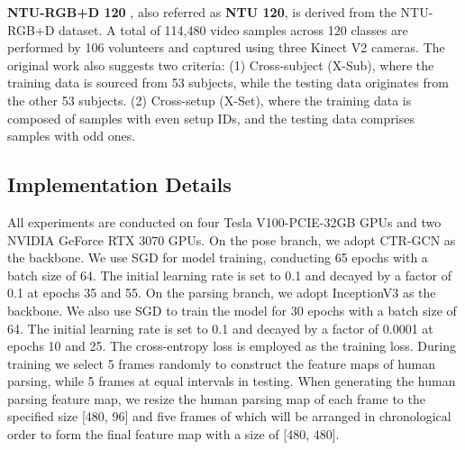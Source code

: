 \documentclass[runningheads]{llncs}
\begin{document}
\textbf{NTU-RGB+D 120} \cite{8713892}, also referred as \textbf{NTU 120}, is derived from the NTU-RGB+D dataset. A total of 114,480 video samples across 120 classes are performed by 106 volunteers and captured using three Kinect V2 cameras. The original work \cite{8713892} also suggests two criteria: (1) Cross-subject (X-Sub), where the training data is sourced from 53 subjects, while the testing data originates from the other 53 subjects. (2) Cross-setup (X-Set), where the training data is composed of samples with even setup IDs, and the testing data comprises samples with odd ones.

\subsection{Implementation Details}
All experiments are conducted on four Tesla V100-PCIE-32GB GPUs and two NVIDIA GeForce RTX 3070 GPUs. On the pose branch, we adopt CTR-GCN \cite{CTR-GCN2021} as the backbone. We use SGD for model training, conducting 65 epochs with a batch size of 64. The initial learning rate is set to 0.1 and decayed by a factor of 0.1 at epochs 35 and 55. On the parsing branch, we adopt InceptionV3 \cite{szegedy2016rethinking} as the backbone. We also use SGD to train the model for 30 epochs with a batch size of 64. The initial learning rate is set to 0.1 and decayed by a factor of 0.0001 at epochs 10 and 25. The cross-entropy loss is employed as the training loss. During training we select 5 frames randomly to construct the feature maps of human parsing, while 5 frames at equal intervals in testing. When generating the human parsing feature map, we resize the human parsing map of each frame to the specified size [480, 96] and five frames of which will be arranged in chronological order to form the final feature map with a size of [480, 480].
\end{document}
